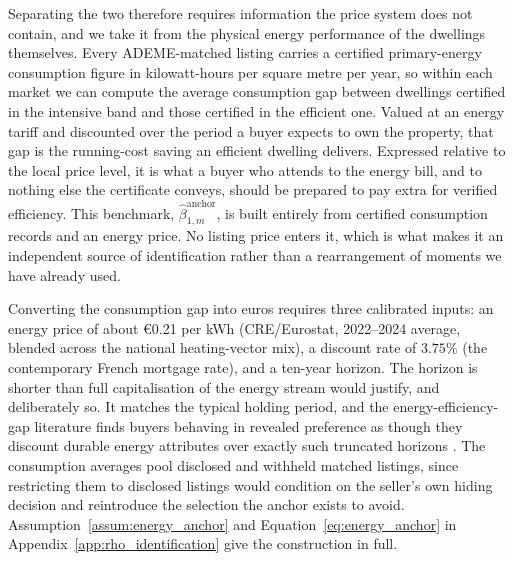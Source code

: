 Separating the two therefore requires information the price system does not contain, and we take it from the physical energy performance of the dwellings themselves. Every ADEME-matched listing carries a certified primary-energy consumption figure in kilowatt-hours per square metre per year, so within each market we can compute the average consumption gap between dwellings certified in the intensive band and those certified in the efficient one. Valued at an energy tariff and discounted over the period a buyer expects to own the property, that gap is the running-cost saving an efficient dwelling delivers. Expressed relative to the local price level, it is what a buyer who attends to the energy bill, and to nothing else the certificate conveys, should be prepared to pay extra for verified efficiency. This benchmark, $\hat\beta_{1,m}^{\mathrm{anchor}}$, is built entirely from certified consumption records and an energy price. No listing price enters it, which is what makes it an independent source of identification rather than a rearrangement of moments we have already used.

Converting the consumption gap into euros requires three calibrated inputs: an energy price of about \euro0.21 per kWh (CRE/Eurostat, 2022--2024 average, blended across the national heating-vector mix), a discount rate of $3.75\%$ (the contemporary French mortgage rate), and a ten-year horizon. The horizon is shorter than full capitalisation of the energy stream would justify, and deliberately so. It matches the typical holding period, and the energy-efficiency-gap literature finds buyers behaving in revealed preference as though they discount durable energy attributes over exactly such truncated horizons \citep{allcott_is_2012}. The consumption averages pool disclosed and withheld matched listings, since restricting them to disclosed listings would condition on the seller's own hiding decision and reintroduce the selection the anchor exists to avoid. Assumption~\ref{assum:energy_anchor} and Equation~\eqref{eq:energy_anchor} in Appendix~\ref{app:rho_identification} give the construction in full.

